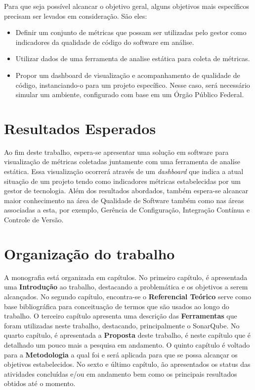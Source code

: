 	Para que seja possível alcancar o objetivo geral, alguns objetivos mais específicos precisam ser levados em consideração. São eles:
		 
	\begin{itemize}
		\item Definir um conjunto de métricas que possam ser utilizadas pelo gestor como indicadores da qualidade de código do software em análise.
		\item Utilizar dados de uma ferramenta de analise estática para coleta de métricas.  
		\item Propor um dashboard de visualização e acompanhamento de qualidade de código, instanciando-o para um projeto específico. Nesse caso, será necessário simular um ambiente, configurado com base em um Órgão Público Federal.
		
	\end{itemize}
	
	
	\section{Resultados Esperados}

Ao fim deste trabalho, espera-se apresentar uma solução em software para visualização de métricas coletadas  juntamente com uma ferramenta de analíse estática. Essa visualização ocorrerá através de um \textit{dashboard} que indica a atual situação de um projeto tendo como indicadores métricas estabelecidas por um gestor de tecnologia. 
Além dos resultados abordados, também espera-se alcancar maior conhecimento na área de Qualidade de Software também como nas áreas associadas a esta, por exemplo, Gerência de Configuração, Integração Contínua e Controle de Versão.

	\section{Organização do trabalho} %
	\label{sec:organização_do_trabalho} 	
A monografia está organizada em capítulos. No primeiro capítulo, é apresentada uma \textbf{Introdução} ao trabalho, destacando a problemática e os objetivos a serem alcançados. No segundo capítulo, encontra-se o \textbf{Referencial Teórico} serve como base bibliográfica para conceituação de termos que são usados ao longo do trabalho. O terceiro capítulo apresenta uma descrição das \textbf{Ferramentas} que foram utilizadas neste trabalho, destacando, principalmente o SonarQube. No quarto capítulo, é apresentada a \textbf{Proposta} deste trabalho, é neste capítulo que é detalhado um pouco mais a pesquisa em andamento. O quinto capítulo é voltado para a \textbf{Metodologia} a qual foi e será aplicada para que se possa alcançar os objetivos estabelecidos. No sexto e último capítulo, ão apresentados os status das atividades concluídas e/ou em andamento bem como os principais resultados obtidos até o momento.
